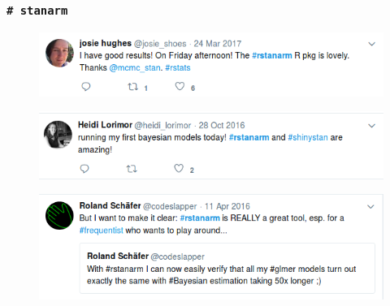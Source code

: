 \documentclass[handout]{beamer}\usepackage[]{graphicx}\usepackage[]{color}
\begin{document}

\begin{frame}
\frametitle{\texttt{\# stanarm}}
\pause
\begin{figure}
\includegraphics[scale=0.4]{Twitter4.png}
\end{figure}
\pause
\begin{figure}
\includegraphics[scale=0.4]{Twitter5.png}
\end{figure}
\pause
\begin{figure}
\includegraphics[scale=0.4]{Twitter6.png}
\end{figure}
\end{frame}

\end{document}
